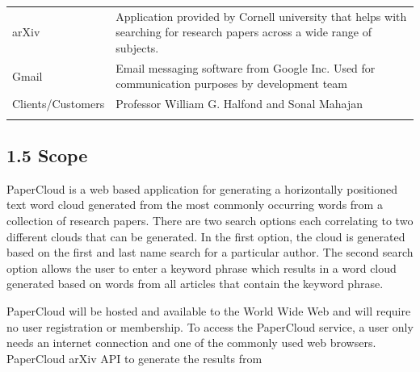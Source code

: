 \documentclass[]{article}
\begin{document}
\begin{longtable}[c]{@{}ll@{}}
\begin{minipage}[t]{0.47\columnwidth}\raggedright
arXiv
\end{minipage} & \begin{minipage}[t]{0.47\columnwidth}\raggedright
Application provided by Cornell university that helps with searching for research papers across a wide range of subjects.
\end{minipage}
\\\addlinespace
\begin{minipage}[t]{0.47\columnwidth}\raggedright
Gmail
\end{minipage} & \begin{minipage}[t]{0.47\columnwidth}\raggedright
Email messaging software from Google Inc. Used for communication purposes by development team
\end{minipage}
\\\addlinespace
\begin{minipage}[t]{0.47\columnwidth}\raggedright
Clients/Customers
\end{minipage} & \begin{minipage}[t]{0.47\columnwidth}\raggedright
Professor William G. Halfond and Sonal Mahajan
\end{minipage}
\\\addlinespace
\bottomrule
\end{longtable}


\subsection{1.5 Scope}\label{scope}

PaperCloud is a web based application for generating a horizontally
positioned text word cloud generated from the most commonly occurring
words from a collection of research papers. There are two search options
each correlating to two different clouds that can be generated. In the
first option, the cloud is generated based on the first and last name
search for a particular author. The second search option allows the user
to enter a keyword phrase which results in a word cloud generated based
on words from all articles that contain the keyword phrase.

PaperCloud will be hosted and available to the World Wide Web and will
require no user registration or membership. To access the PaperCloud
service, a user only needs an internet connection and one of the
commonly used web browsers. PaperCloud arXiv API to generate the results
from
\end{document}
